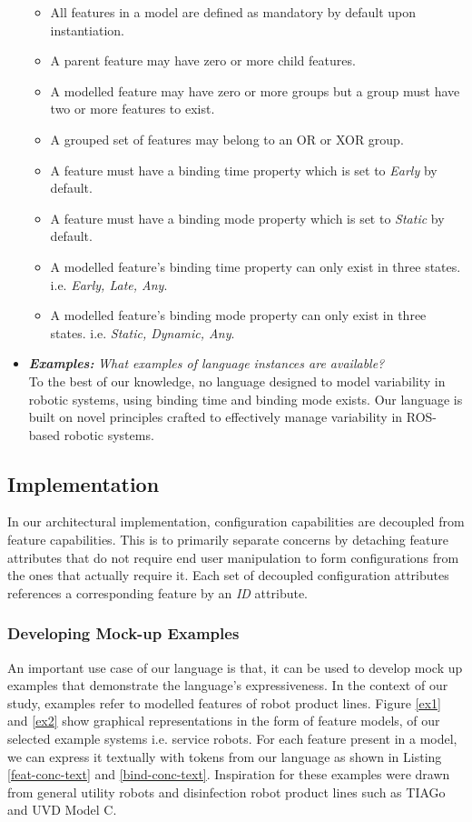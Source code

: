 \documentclass[conference]{IEEEtran}
\begin{document}
\begin{itemize}
\begin{itemize}
            \item All features in a model are defined as mandatory by default upon instantiation.
            \item A parent feature may have zero or more child features.
            \item A modelled feature may have zero or more groups but a group must have two or more features to exist.
            \item A grouped set of features may belong to an OR or XOR group.
            \item A feature must have a binding time property which is set to \textit{Early} by default.
            \item A feature must have a binding mode property which is set to \textit{Static} by default.
            \item A modelled feature's binding time property can only exist in three states. i.e. \textit{Early, Late, Any}.
            \item A modelled feature's binding mode property can only exist in three states. i.e. \textit{Static, Dynamic, Any}.
        \end{itemize}
        \item \textit{\textbf{Examples:}} \textit{What examples of language instances are available?}\\
        To the best of our knowledge, no language designed to model variability in robotic systems, using binding time and binding mode exists. Our language is built on novel principles crafted to effectively manage variability in ROS-based robotic systems.
    \end{itemize}
    
\subsection{Implementation}
In our architectural implementation, configuration capabilities are decoupled from feature capabilities. This is to primarily separate concerns by detaching feature attributes that do not require end user manipulation to form configurations from the ones that actually require it. Each set of decoupled configuration attributes references a corresponding feature by an \textit{ID} attribute.

\subsubsection{Developing Mock-up Examples}
An important use case of our language is that, it can be used to develop mock up examples that demonstrate the language's expressiveness. In the context of our study, examples refer to modelled features of robot product lines. Figure \ref{ex1} and \ref{ex2} show graphical representations in the form of feature models, of our selected example systems i.e. service robots. For each feature present in a model, we can express it textually with tokens from our language as shown in Listing \ref{feat-conc-text} and \ref{bind-conc-text}. Inspiration for these examples were drawn from general utility robots and disinfection robot product lines such as TIAGo and UVD Model C.
    
\end{document}
